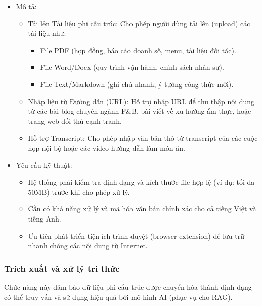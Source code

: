 \begin{itemize}
\item
  Mô tả:

  \begin{itemize}
  \item
    Tải lên Tài liệu phi cấu trúc: Cho phép người dùng tải lên (upload)
    các tài liệu như:

    \begin{itemize}
    \item
      File PDF (hợp đồng, báo cáo doanh số, menu, tài liệu đối tác).
    \item
      File Word/Docx (quy trình vận hành, chính sách nhân sự).
    \item
      File Text/Markdown (ghi chú nhanh, ý tưởng công thức mới).
    \end{itemize}
  \item
    Nhập liệu từ Đường dẫn (URL): Hỗ trợ nhập URL để thu thập nội dung
    từ các bài blog chuyên ngành F\&B, bài viết về xu hướng ẩm thực,
    hoặc trang web đối thủ cạnh tranh.
  \item
    Hỗ trợ Transcript: Cho phép nhập văn bản thô từ transcript của các
    cuộc họp nội bộ hoặc các video hướng dẫn làm món ăn.
  \end{itemize}
\item
  Yêu cầu kỹ thuật:

  \begin{itemize}
  \item
    Hệ thống phải kiểm tra định dạng và kích thước file hợp lệ (ví dụ:
    tối đa 50MB) trước khi cho phép xử lý.
  \item
    Cần có khả năng xử lý và mã hóa văn bản chính xác cho cả tiếng Việt
    và tiếng Anh.
  \item
    Ưu tiên phát triển tiện ích trình duyệt (browser extension) để lưu
    trữ nhanh chóng các nội dung từ Internet.
  \end{itemize}
\end{itemize}

\subsubsection{Trích xuất và xử lý tri
thức}\label{truxedch-xuux1ea5t-vuxe0-xux1eed-luxfd-tri-thux1ee9c}

Chức năng này đảm bảo dữ liệu phi cấu trúc được chuyển hóa thành định
dạng có thể truy vấn và sử dụng hiệu quả bởi mô hình AI (phục vụ cho
RAG).

